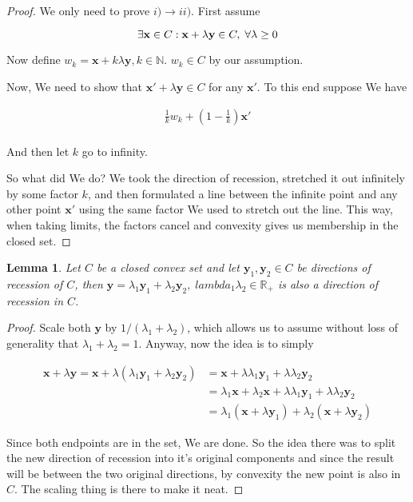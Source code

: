 \documentclass{article}
\newtheorem{lemma}[theorem]{Lemma}
\begin{document}
		\begin{proof}
			We only need to prove $i)\to ii)$. First assume 
			
			\[ \exists\mathbf{x}\in C: \mathbf{x} + \lambda\mathbf{y} \in C,\;\forall\lambda\ge 0\\ \]
			
			Now define $w_k = \mathbf{x} + k\lambda\mathbf{y}, k\in\mathbb{N}$. $w_k\in C$ by our assumption. 
			
			Now, We need to show that $\mathbf{x'}+\lambda\mathbf{y}\in C$ for any $\mathbf{x'}$. To this end suppose We have
			
			\begin{align*}
				\frac{1}{k}w_k + (1-\frac{1}{k})\mathbf{x'}\\
			\end{align*}
			
			And then let $k$ go to infinity.
			
			So what did We do? We took the direction of recession, stretched it out infinitely by some factor $k$, and then formulated a line between the infinite point and any other point $\mathbf{x'}$ using the same factor We used to stretch out the line. This way, when taking limits, the factors cancel and convexity gives us membership in the closed set.
		\end{proof}
		
		\begin{lemma}
			Let $C$ be a closed convex set and let $\mathbf{y}_1, \mathbf{y}_2\in C$ be directions of recession of $C$, then $\mathbf{y} = \lambda_1\mathbf{y}_1 + \lambda_2\mathbf{y}_2,\;lambda_1\lambda_2\in\mathbb{R}_+$ is also a direction of recession in $C$.
		\end{lemma}
		
		\begin{proof}
			Scale both $\mathbf{y}$ by $1/(\lambda_1 + \lambda_2)$, which allows us to assume without loss of generality that $\lambda_1 + \lambda_2 = 1$. Anyway, now the idea is to simply
			
			\begin{align*}
				\mathbf{x} + \lambda\mathbf{y} = \mathbf{x} + \lambda (\lambda_1\mathbf{y}_1 + \lambda_2\mathbf{y}_2) &= \mathbf{x} + \lambda \lambda_1\mathbf{y}_1 +  \lambda\lambda_2\mathbf{y}_2\\
				&=\lambda_1\mathbf{x} + \lambda_2\mathbf{x} + \lambda \lambda_1\mathbf{y}_1 +  \lambda\lambda_2\mathbf{y}_2\\
				&=\lambda_1(\mathbf{x} + \lambda\mathbf{y}_1) + \lambda_2(\mathbf{x}  +  \lambda\mathbf{y}_2)
			\end{align*}
			
			Since both endpoints are in the set, We are done. So the idea there was to split the new direction of recession into it's original components and since the result will be between  the two original directions, by convexity the new point is also in $C$. The scaling thing is there to make it neat.

		\end{proof}
		
\end{document}

